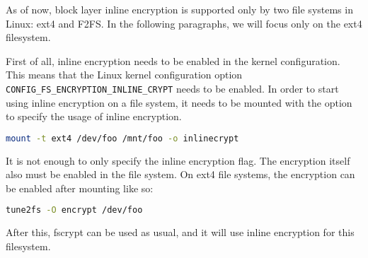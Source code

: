 As of now, block layer inline encryption is supported only by two file systems in Linux: ext4 and F2FS. 
In the following paragraphs, we will focus only on the ext4 filesystem.

First of all, inline encryption needs to be enabled in the kernel configuration. This means that the Linux kernel configuration option \verb|CONFIG_FS_ENCRYPTION_INLINE_CRYPT| needs to be enabled.
In order to start using inline encryption on a file system, it needs to be mounted with the option to specify the usage of inline encryption.
\begin{lstlisting}[language=bash]
mount -t ext4 /dev/foo /mnt/foo -o inlinecrypt
\end{lstlisting}
It is not enough to only specify the inline encryption flag. The encryption itself also must be enabled in the file system. On ext4 file systems, the encryption can be enabled after mounting like so:
\begin{lstlisting}[language=bash]
tune2fs -O encrypt /dev/foo
\end{lstlisting}
After this, fscrypt can be used as usual, and it will use inline encryption for this filesystem.














